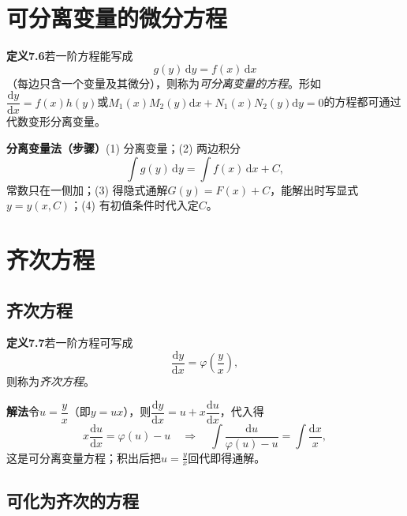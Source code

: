 \section{可分离变量的微分方程}

\noindent\textbf{定义7.6}\quad 若一阶方程能写成
\[
g(y)\,\mathrm{d}y=f(x)\,\mathrm{d}x
\]
（每边只含一个变量及其微分），则称为\emph{可分离变量的方程}。形如$\dfrac{\mathrm{d}y}{\mathrm{d}x}=f(x)h(y)$或$M_1(x)M_2(y)\mathrm{d}x+N_1(x)N_2(y)\mathrm{d}y=0$的方程都可通过代数变形分离变量。

\noindent\textbf{分离变量法（步骤）}\quad (1) 分离变量；(2) 两边积分
\[
\int g(y)\,\mathrm{d}y=\int f(x)\,\mathrm{d}x+C ,
\]
常数只在一侧加；(3) 得隐式通解$G(y)=F(x)+C$，能解出时写显式$y=y(x,C)$；(4) 有初值条件时代入定$C$。



\section{齐次方程}

\subsection{齐次方程}

\noindent\textbf{定义7.7}\quad 若一阶方程可写成
\[
\frac{\mathrm{d}y}{\mathrm{d}x}=\varphi\!\left(\frac{y}{x}\right),
\]
则称为\emph{齐次方程}。

\noindent\textbf{解法}\quad 令$u=\dfrac{y}{x}$（即$y=ux$），则$\dfrac{\mathrm{d}y}{\mathrm{d}x}=u+x\dfrac{\mathrm{d}u}{\mathrm{d}x}$，代入得
\[
x\frac{\mathrm{d}u}{\mathrm{d}x}=\varphi(u)-u
\quad\Longrightarrow\quad
\int\frac{\mathrm{d}u}{\varphi(u)-u}=\int\frac{\mathrm{d}x}{x},
\]
这是可分离变量方程；积出后把$u=\frac{y}{x}$回代即得通解。



\subsection{可化为齐次的方程}

